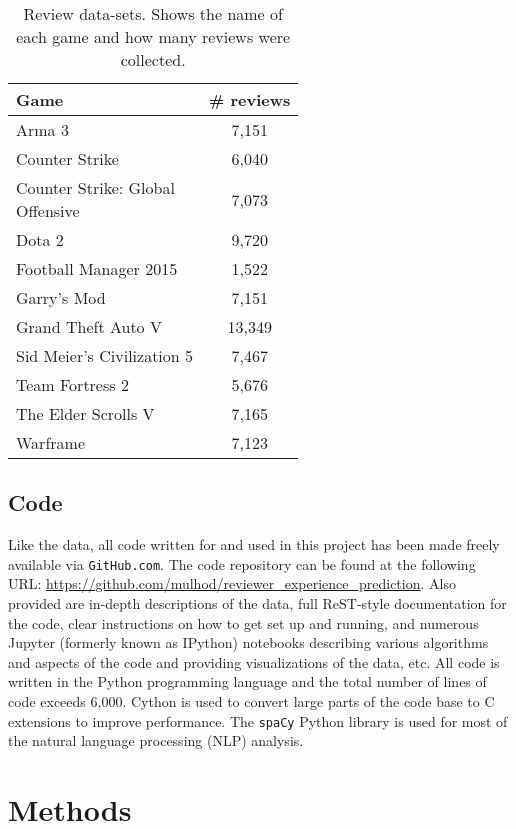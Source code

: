 \documentclass[9pt]{article}
\begin{document}
\begin{table}[ht]
\centering
\renewcommand{\arraystretch}{1.2}
\begin{tabular}{|l|c|}
\hline \bf Game & \bf \# reviews \\ \hline
Arma 3 & 7,151 \\
Counter Strike & 6,040 \\
\parbox[t]{4cm}{Counter Strike: Global\\Offensive} & 7,073 \\
Dota 2 & 9,720 \\
Football Manager 2015 & 1,522 \\
Garry's Mod & 7,151 \\
Grand Theft Auto V & 13,349 \\
Sid Meier's Civilization 5 & 7,467 \\
Team Fortress 2 & 5,676 \\
The Elder Scrolls V & 7,165 \\
Warframe & 7,123 \\ \hline
\end{tabular}
\caption{Review data-sets. Shows the name of each game and how many reviews were collected.}
\label{tab:datasets}
\end{table}

\subsection{Code}
\label{ssec:code}

Like the data, all code written for and used in this project has been made freely available via {\tt GitHub.com}. The code repository can be found at the following URL: \url{https://github.com/mulhod/reviewer_experience_prediction}. Also provided are in-depth descriptions of the data, full ReST-style documentation for the code, clear instructions on how to get set up and running, and numerous Jupyter (formerly known as IPython) notebooks describing various algorithms and aspects of the code and providing visualizations of the data, etc. All code is written in the Python programming language and the total number of lines of code exceeds 6,000. Cython is used to convert large parts of the code base to C extensions to improve performance. The {\tt spaCy} Python library is used for most of the natural language processing (NLP) analysis.

\section{Methods}
\label{sec:methods}
\end{document}
